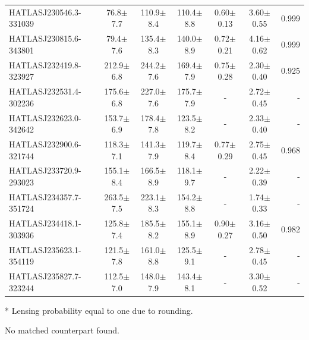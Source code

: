 \documentclass[fleqn,usenatbib]{mnras}
\begin{document}
\begin{table}
\begin{threeparttable}
\begin{tabular}{lcccccr}
		HATLASJ230546.3-331039 & 76.8$\pm$7.7 & 110.9$\pm$8.4 & 110.4$\pm$8.8 & 0.60$\pm$0.13 & 3.60$\pm$0.55 & 0.999 \\
		HATLASJ230815.6-343801 & 79.4$\pm$7.6 & 135.4$\pm$8.3 & 140.0$\pm$8.9 & 0.72$\pm$0.21 & 4.16$\pm$0.62 & 0.999 \\
		HATLASJ232419.8-323927 & 212.9$\pm$6.8 & 244.2$\pm$7.6 & 169.4$\pm$7.9 & 0.75$\pm$0.28 & 2.30$\pm$0.40 & 0.925 \\
		HATLASJ232531.4-302236 & 175.6$\pm$6.8 & 227.0$\pm$7.6 & 175.7$\pm$7.9 & - & 2.72$\pm$0.45 & - \\
		HATLASJ232623.0-342642 & 153.7$\pm$6.9 & 178.4$\pm$7.8 & 123.5$\pm$8.2 & - & 2.33$\pm$0.40 & - \\
		HATLASJ232900.6-321744 & 118.3$\pm$7.1 & 141.3$\pm$7.9 & 119.7$\pm$8.4 & 0.77$\pm$0.29 & 2.75$\pm$0.45 & 0.968 \\
		HATLASJ233720.9-293023 & 155.1$\pm$8.4 & 166.5$\pm$8.9 & 118.1$\pm$9.7 & - & 2.22$\pm$0.39 & - \\
		HATLASJ234357.7-351724 & 263.5$\pm$7.5 & 223.1$\pm$8.3 & 154.2$\pm$8.8 & - & 1.74$\pm$0.33 & - \\
		HATLASJ234418.1-303936 & 125.8$\pm$7.4 & 185.5$\pm$8.2 & 155.1$\pm$8.9 & 0.90$\pm$0.27 & 3.16$\pm$0.50 & 0.982 \\
		HATLASJ235623.1-354119 & 121.5$\pm$7.8 & 161.0$\pm$8.8 & 125.5$\pm$9.1 & - & 2.78$\pm$0.45 & - \\
		HATLASJ235827.7-323244 & 112.5$\pm$7.0 & 148.0$\pm$7.9 & 143.4$\pm$8.1 & - & 3.30$\pm$0.52 & - \\
		\hline
		\hline
	\end{tabular}
	\begin{tablenotes}
		\item[*] Lensing probability equal to one due to rounding.
		\item[\textdagger] No matched counterpart found.
	\end{tablenotes}
	\end{threeparttable}
\end{table}


\bsp	%
\label{lastpage}
\end{document}
